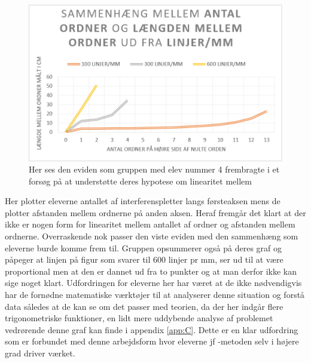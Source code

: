 \begin{figure}[h!]
	\centering
	\includegraphics[width=\textwidth]{Figs/EviJacob}
	\caption{Her ses den eviden som gruppen med elev nummer 4 frembragte i et forsøg på at understøtte deres hypotese om linearitet mellem }
	\label{fig:evidens.jacob}
\end{figure}

Her plotter eleverne antallet af interferenspletter langs førsteaksen mens de plotter afstanden mellem ordnerne på anden aksen. Heraf fremgår det klart at der ikke er nogen form for linearitet mellem antallet af ordner og afstanden mellem ordnerne. Overraskende nok passer den viste eviden med den sammenhæng som eleverne burde komme frem til. Gruppen opsummerer også på deres graf og påpeger at linjen på figur  som svarer til 600 linjer pr mm, ser ud til at være proportional men at den er dannet ud fra to punkter og at man derfor ikke kan sige noget klart. 
Udfordringen for eleverne her har været at de ikke nødvendigvis har de fornødne matematiske værktøjer til at analyserer denne situation og forstå data således at de kan se om det passer med teorien, da der her indgår flere trigonometriske funktioner, en lidt mere uddybende analyse af problemet vedrørende denne graf kan finde i appendix \vref{app:C}. Dette er en klar udfordring som er forbundet med denne arbejdsform hvor eleverne jf \ib-metoden selv i højere grad driver værket. 

